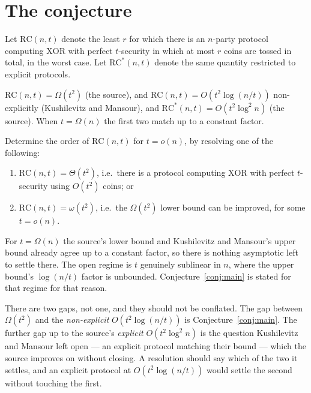 \documentclass{aicr-conjecture}
\newcommand{\Om}{\Omega}
\begin{document}
\section{The conjecture}\label{sec:conjectures}

\begin{definition}\label{def:rc}
Let $\mathrm{RC}(n,t)$ denote the least $r$ for which there is an
$n$-party protocol computing $\mathrm{XOR}$ with perfect $t$-security in
which at most $r$ coins are tossed in total, in the worst case. Let
$\mathrm{RC}^{\ast}(n,t)$ denote the same quantity restricted to
explicit protocols.
\end{definition}

\begin{theorem}\label{thm:known}
$\mathrm{RC}(n,t) = \Om(t^{2})$ (the source), and $\mathrm{RC}(n,t) =
O(t^{2}\log(n/t))$ non-explicitly (Kushilevitz and Mansour), and
$\mathrm{RC}^{\ast}(n,t) = O(t^{2}\log^{2} n)$ (the source). When
$t = \Om(n)$ the first two match up to a constant factor.
\end{theorem}

\begin{conjecture}\label{conj:main}
Determine the order of $\mathrm{RC}(n,t)$ for $t = o(n)$, by resolving one
of the following:
\begin{enumerate}[nosep,label=(\alph*)]
  \item $\mathrm{RC}(n,t) = \Theta(t^{2})$, i.e.\ there is a protocol
    computing $\mathrm{XOR}$ with perfect $t$-security using $O(t^{2})$
    coins; or
  \item $\mathrm{RC}(n,t) = \omega(t^{2})$, i.e.\ the $\Om(t^{2})$ lower
    bound can be improved, for some $t = o(n)$.
\end{enumerate}
\end{conjecture}

\begin{remark}[Why $t = o(n)$, and why the regime matters]
For $t = \Om(n)$ the source's lower bound and Kushilevitz and Mansour's
upper bound already agree up to a constant factor, so there is nothing
asymptotic left to settle there. The open regime is $t$ genuinely
sublinear in $n$, where the upper bound's $\log(n/t)$ factor is
unbounded. Conjecture~\ref{conj:main} is stated for that regime for that
reason.
\end{remark}

\begin{remark}\label{rem:explicit}
There are two gaps, not one, and they should not be conflated. The gap
between $\Om(t^{2})$ and the \emph{non-explicit}
$O(t^{2}\log(n/t))$ is Conjecture~\ref{conj:main}. The further gap up to
the source's \emph{explicit} $O(t^{2}\log^{2} n)$ is the question
Kushilevitz and Mansour left open --- an explicit protocol matching their
bound --- which the source improves on without closing. A resolution should
say which of the two it settles, and an explicit protocol at
$O(t^{2}\log(n/t))$ would settle the second without touching the first.
\end{remark}
\end{document}
